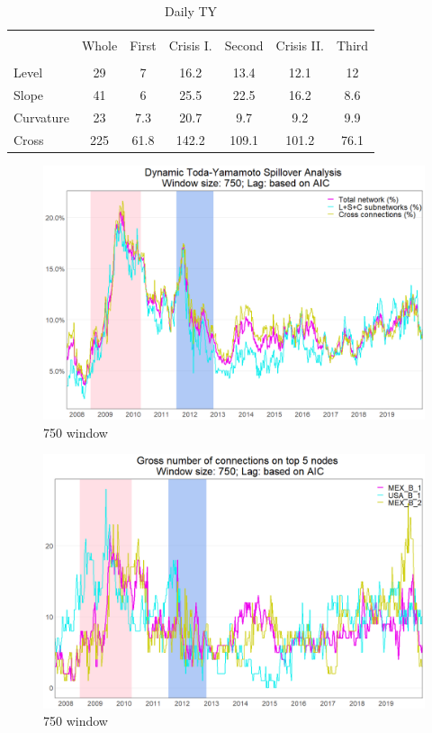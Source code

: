 \documentclass{article}
\begin{document}
\begin{table}[h]
\caption{Daily TY} %
\fontsize{10}{10}\selectfont
\centering%
\begin{tabular}{l | cccccc}%
\hline\hline \\ [-1.5ex]                         %


		& 	Whole &	First	&	Crisis I.& 	Second& 	Crisis II.&	 Third \\
\hline \\ [-1.5ex]  
Level	&		29	&	7	&	16.2	&	13.4	&  	12.1	&	 12\\
Slope	&		41	&	6	&	25.5	&	22.5	& 	16.2	& 	8.6\\
Curvature	&	23	&	7.3	&	20.7	&	9.7	& 	9.2	&	 9.9\\
Cross	&		225	&	61.8	&	142.2	&	109.1	& 	101.2	& 	76.1\\


\hline            
\end{tabular}
\label{table:nonlin}%
\end{table}

\begin{figure}[H]
\caption{750 window}
\includegraphics[width=11.5cm]{Time_series_750}
\centering
\end{figure}

\begin{figure}[H]
\caption{750 window}
\includegraphics[width=11.5cm]{top5nodes}
\centering
\end{figure}
\end{document}
